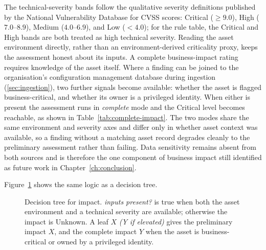 The technical-severity bands follow the qualitative severity definitions published by the National Vulnerability Database for \ac{CVSS} scores: Critical ($\geq 9.0$), High ($7.0$--$8.9$), Medium ($4.0$--$6.9$), and Low ($< 4.0$); for the rule table, the Critical and High bands are both treated as high technical severity. Reading the asset environment directly, rather than an environment-derived criticality proxy, keeps the assessment honest about its inputs. A complete business-impact rating requires knowledge of the asset itself. Where a finding can be joined to the organisation's configuration management database during ingestion (\cref{sec:ingestion}), two further signals become available: whether the asset is flagged business-critical, and whether its owner is a privileged identity. When either is present the assessment runs in \emph{complete} mode and the Critical level becomes reachable, as shown in Table~\ref{tab:complete-impact}. The two modes share the same environment and severity axes and differ only in whether asset context was available, so a finding without a matching asset record degrades cleanly to the preliminary assessment rather than failing. Data sensitivity remains absent from both sources and is therefore the one component of business impact still identified as future work in Chapter~\ref{ch:conclusion}.

Figure~\ref{fig:tree-impact} shows the same logic as a decision tree.

\begin{figure}[h]
\centering
{}
\caption{Decision tree for impact. \emph{inputs present?} is true when both the asset environment and a technical severity are available; otherwise the impact is Unknown. A leaf $X$ \emph{(Y if elevated)} gives the preliminary impact $X$, and the complete impact $Y$ when the asset is business-critical or owned by a privileged identity.}
\label{fig:tree-impact}
\end{figure}

